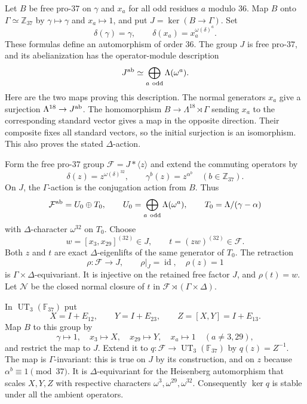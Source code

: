 \documentclass[11pt]{article}
\theoremstyle{definition}\newtheorem{definition}[theorem]{Definition}
\begin{document}
Let $B$ be free pro-$37$ on $\gamma$ and $x_a$ for all odd
residues $a$ modulo $36$.  Map $B$ onto $\Gamma\simeq\mathbb Z_{37}$
by $\gamma\mapsto\gamma$ and $x_a\mapsto1$, and put
$J=\ker(B\to\Gamma)$.  Set
\[
 \delta(\gamma)=\gamma,\qquad
 \delta(x_a)=x_a^{\omega(\delta)^a}.
\]
These formulas define an automorphism of order $36$.
The group $J$ is free pro-$37$, and its abelianization has the
operator-module description
\[
 J^{\rm ab}\simeq\bigoplus_{a\ \mathrm{odd}}\Lambda(\omega^a).
\]
Here are the two maps proving this description.  The normal
generators $x_a$ give a surjection $\Lambda^{18}\to J^{\rm ab}$.
The homomorphism $B\to\Lambda^{18}\rtimes\Gamma$ sending
$x_a$ to the corresponding standard vector gives a map in the
opposite direction.  Their composite fixes all standard vectors,
so the initial surjection is an isomorphism.  This also proves
the stated $\Delta$-action.

Form the free pro-$37$ group $\mathcal F=J*\langle z\rangle$
and extend the commuting operators by
\[
 \delta(z)=z^{\omega(\delta)^{32}},\qquad
 \gamma^b(z)=z^{\alpha^b}\quad(b\in\mathbb Z_{37}).
\]
On $J$, the $\Gamma$-action is the conjugation action from $B$.
Thus
\[
 \mathcal F^{\rm ab}=U_0\oplus T_0,
 \qquad
 U_0=\bigoplus_{a\ \mathrm{odd}}\Lambda(\omega^a),\qquad
 T_0=\Lambda/(\gamma-\alpha)
\]
with $\Delta$-character $\omega^{32}$ on $T_0$.
Choose
\[
 w=[x_3,x_{29}]^{(32)}\in J,
 \qquad t=(zw)^{(32)}\in\mathcal F.
\]
Both $z$ and $t$ are exact $\Delta$-eigenlifts of the same
generator of $T_0$.  The retraction
\[
 \rho:\mathcal F\longrightarrow J,\qquad
 \rho|_J=\operatorname{id},\quad\rho(z)=1
\]
is $\Gamma\times\Delta$-equivariant.  It is injective on the
retained free factor $J$, and $\rho(t)=w$.
Let $\mathcal N$ be the closed normal closure of $t$ in
$\mathcal F\rtimes(\Gamma\times\Delta)$.

In $\operatorname{UT}_3(\mathbb F_{37})$ put
\[
 X=I+E_{12},\qquad Y=I+E_{23},\qquad
 Z=[X,Y]=I+E_{13}.
\]
Map $B$ to this group by
\[
 \gamma\mapsto1,\quad x_3\mapsto X,\quad x_{29}\mapsto Y,
 \quad x_a\mapsto1\quad(a\ne3,29),
\]
and restrict the map to $J$.  Extend it to
$q:\mathcal F\to\operatorname{UT}_3(\mathbb F_{37})$ by
$q(z)=Z^{-1}$.  The map is $\Gamma$-invariant: this is true
on $J$ by its construction, and on $z$ because
$\alpha^b\equiv1\pmod{37}$.  It is $\Delta$-equivariant for
the Heisenberg automorphism that scales $X,Y,Z$ with respective
characters $\omega^3,\omega^{29},\omega^{32}$.
Consequently $\ker q$ is stable under all the ambient operators.
\end{document}
